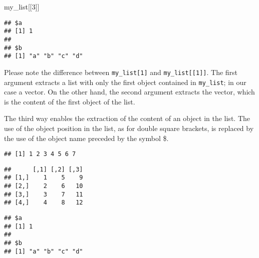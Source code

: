 \documentclass[]{book}
\newenvironment{Shaded}{\begin{snugshade}}{\end{snugshade}}
\newcommand{\DecValTok}[1]{\textcolor[rgb]{0.00,0.00,0.81}{{#1}}}
\newcommand{\NormalTok}[1]{{#1}}
\begin{document}
\begin{Shaded}
\begin{Highlighting}[]
\NormalTok{my_list[[}\DecValTok{3}\NormalTok{]]}
\end{Highlighting}
\end{Shaded}

\begin{verbatim}
## $a
## [1] 1
## 
## $b
## [1] "a" "b" "c" "d"
\end{verbatim}

Please note the difference between \texttt{my\_list{[}1{]}} and
\texttt{my\_list{[}{[}1{]}{]}}. The first argument extracts a list with
only the first object contained in \texttt{my\_list}; in our case a
vector. On the other hand, the second argument extracts the vector,
which is the content of the first object of the list.

The third way enables the extraction of the content of an object in the
list. The use of the object position in the list, as for double square
brackets, is replaced by the use of the object name preceded by the
symbol \$.

\begin{Shaded}
\end{Shaded}

\begin{verbatim}
## [1] 1 2 3 4 5 6 7
\end{verbatim}

\begin{Shaded}
\end{Shaded}

\begin{verbatim}
##      [,1] [,2] [,3]
## [1,]    1    5    9
## [2,]    2    6   10
## [3,]    3    7   11
## [4,]    4    8   12
\end{verbatim}

\begin{Shaded}
\end{Shaded}

\begin{verbatim}
## $a
## [1] 1
## 
## $b
## [1] "a" "b" "c" "d"
\end{verbatim}
\end{document}
